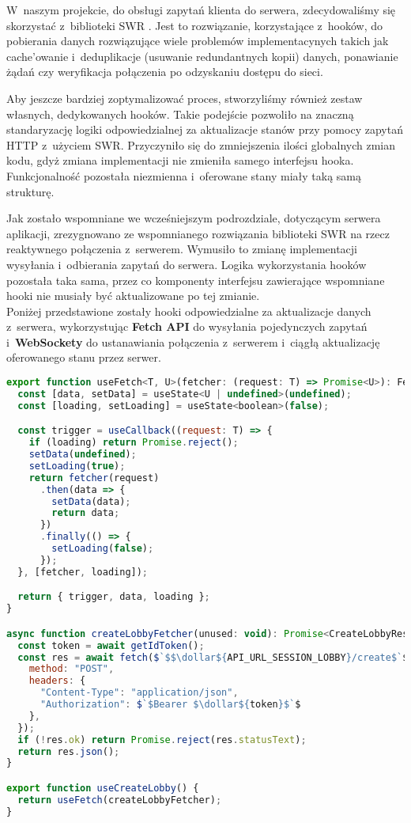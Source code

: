 W~naszym projekcie, do obsługi zapytań klienta do serwera, zdecydowaliśmy się
skorzystać z~biblioteki SWR \cite{SWR}.
Jest to rozwiązanie, korzystające z~hooków, do
pobierania danych rozwiązujące wiele problemów implementacynych takich jak
cache'owanie i~deduplikacje (usuwanie redundantnych kopii) danych, ponawianie żądań
czy weryfikacja połączenia po odzyskaniu dostępu do sieci.

Aby jeszcze bardziej zoptymalizować proces, stworzyliśmy
również zestaw własnych, dedykowanych hooków. Takie podejście pozwoliło na
znaczną standaryzację logiki odpowiedzialnej za aktualizacje stanów przy pomocy
zapytań HTTP z~użyciem SWR. Przyczyniło się do zmniejszenia ilości
globalnych zmian kodu, gdyż zmiana implementacji nie zmieniła samego interfejsu
hooka. Funkcjonalność pozostała niezmienna i~oferowane stany miały taką samą strukturę.


Jak zostało wspomniane we wcześniejszym podrozdziale, dotyczącym serwera aplikacji,
zrezygnowano ze wspomnianego rozwiązania biblioteki SWR na rzecz reaktywnego
połączenia z~serwerem. Wymusiło to zmianę implementacji wysyłania i~odbierania
zapytań do serwera. Logika
wykorzystania hooków pozostała taka sama, przez co komponenty interfejsu
zawierające wspomniane hooki nie musiały być aktualizowane po tej zmianie. \\

Poniżej przedstawione zostały hooki odpowiedzialne za aktualizacje
danych z~serwera, wykorzystując \textbf{Fetch API} do wysyłania pojedynczych
zapytań i~\textbf{WebSockety} do ustanawiania połączenia z~serwerem
i~ciągłą aktualizację oferowanego stanu przez serwer.

\begin{lstlisting}[language=JavaScript, caption=Hooki z Fetch API, label={lst:fetch-hooks}, captionpos=b]
export function useFetch<T, U>(fetcher: (request: T) => Promise<U>): FetchState<T, U> {
  const [data, setData] = useState<U | undefined>(undefined);
  const [loading, setLoading] = useState<boolean>(false);

  const trigger = useCallback((request: T) => {
    if (loading) return Promise.reject();
    setData(undefined);
    setLoading(true);
    return fetcher(request)
      .then(data => {
        setData(data);
        return data;
      })
      .finally(() => {
        setLoading(false);
      });
  }, [fetcher, loading]);

  return { trigger, data, loading };
}

async function createLobbyFetcher(unused: void): Promise<CreateLobbyResponse> {
  const token = await getIdToken();
  const res = await fetch($`$$\dollar${API_URL_SESSION_LOBBY}/create$`$, {
    method: "POST",
    headers: {
      "Content-Type": "application/json",
      "Authorization": $`$Bearer $\dollar${token}$`$
    },
  });
  if (!res.ok) return Promise.reject(res.statusText);
  return res.json();
}

export function useCreateLobby() {
  return useFetch(createLobbyFetcher);
}
\end{lstlisting}

